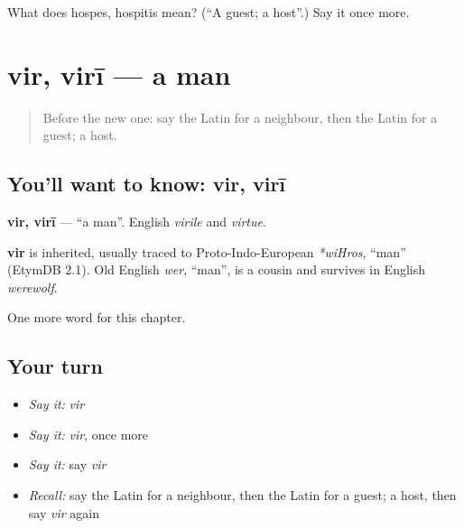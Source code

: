 \begin{tcolorbox}[breakable,colback=teal!4,colframe=teal!35!black,title={Before you move on}]
What does hospes, hospitis mean? (\textquotedblleft{}A guest; a host\textquotedblright{}.) Say it once more.
\end{tcolorbox}
\section[vir, virī]{vir, virī — a man}

\label{lesson:LA-C72-vir}



\begin{quote}
Before the new one: say the Latin for a neighbour, then the Latin for a guest; a host.
\end{quote}

\subsection*{You'll want to know: vir, virī}
\textbf{vir, virī} — \textquotedblleft{}a man\textquotedblright{}. English \emph{virile} and \emph{virtue}.

\begin{cousinweb}
\textbf{vir} is inherited, usually traced to Proto-Indo-European \emph{*wiHros}, \textquotedblleft{}man\textquotedblright{} (EtymDB 2.1). Old English \emph{wer}, \textquotedblleft{}man\textquotedblright{}, is a cousin and survives in English \emph{werewolf}.
\end{cousinweb}

\begin{grammarlens}[title={What you've built}]
One more word for this chapter.
\end{grammarlens}

\subsection*{Your turn}
\begin{itemize}
\raggedright
  \item \emph{Say it:} \emph{vir}
  \item \emph{Say it:} \emph{vir}, once more
  \item \emph{Say it:} say \emph{vir}
  \item \emph{Recall:} say the Latin for a neighbour, then the Latin for a guest; a host, then say \emph{vir} again
\end{itemize}

